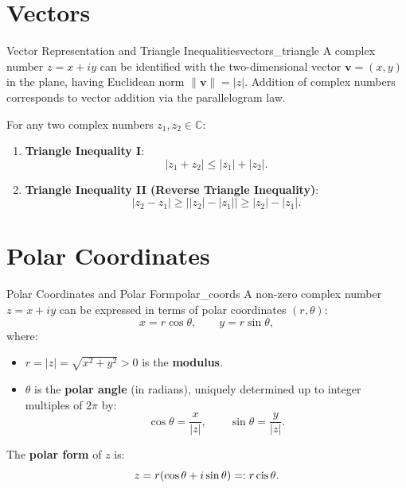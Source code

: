 \section{Vectors}

\begin{proposition}{Vector Representation and Triangle Inequalities}{vectors_triangle}
A complex number $z = x + iy$ can be identified with the two-dimensional vector $\mathbf{v} = (x, y)$ in the plane, having Euclidean norm $\|\mathbf{v}\| = |z|$.
Addition of complex numbers corresponds to vector addition via the parallelogram law.

For any two complex numbers $z_1, z_2 \in \mathbb{C}$:
\begin{enumerate}
    \item \textbf{Triangle Inequality I}:
    \begin{equation}
    |z_1 + z_2| \le |z_1| + |z_2|.
    \end{equation}
    \item \textbf{Triangle Inequality II (Reverse Triangle Inequality)}:
    \begin{equation}
    |z_2 - z_1| \ge \big||z_2| - |z_1|\big| \ge |z_2| - |z_1|.
    \end{equation}
\end{enumerate}
\end{proposition}


\section{Polar Coordinates}

\begin{definition}{Polar Coordinates and Polar Form}{polar_coords}
A non-zero complex number $z = x + iy$ can be expressed in terms of polar coordinates $(r, \theta)$:
\begin{equation}
x = r \cos\theta, \qquad y = r \sin\theta,
\end{equation}
where:
\begin{itemize}
    \item $r = |z| = \sqrt{x^2 + y^2} > 0$ is the \textbf{modulus}.
    \item $\theta$ is the \textbf{polar angle} (in radians), uniquely determined up to integer multiples of $2\pi$ by:
    \begin{equation}
    \cos\theta = \frac{x}{|z|}, \qquad \sin\theta = \frac{y}{|z|}.
    \end{equation}
\end{itemize}
The \textbf{polar form} of $z$ is:
\begin{equation}
z = r(\cos\theta + i\sin\theta) =: r \operatorname{cis}\theta.
\end{equation}
\end{definition}

